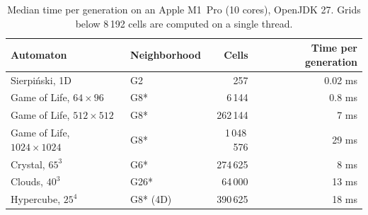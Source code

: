 \begin{table}[H]
    \centering\small
    \begin{tabular}{@{}llrr@{}}
        \toprule
        Automaton                        & Neighborhood & Cells       & Time per generation \\
        \midrule
        Sierpi\'nski, 1D                 & G2           & 257         & 0.02 ms             \\
        Game of Life, $64 \times 96$     & G8*          & 6\,144      & 0.8 ms              \\
        Game of Life, $512 \times 512$   & G8*          & 262\,144    & 7 ms                \\
        Game of Life, $1024 \times 1024$ & G8*          & 1\,048\,576 & 29 ms               \\
        Crystal, $65^3$                  & G6*          & 274\,625    & 8 ms                \\
        Clouds, $40^3$                   & G26*         & 64\,000     & 13 ms               \\
        Hypercube, $25^4$                & G8* (4D)     & 390\,625    & 18 ms               \\
        \bottomrule
    \end{tabular}
    \caption{Median time per generation on an Apple M1~Pro (10 cores), OpenJDK 27. Grids below
        8\,192 cells are computed on a single thread.}
    \label{tab:performance}
\end{table}
